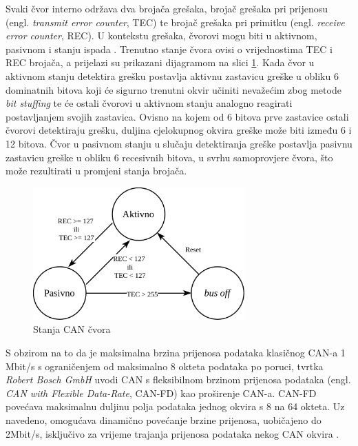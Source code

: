 \documentclass[times, utf8, diplomski, numeric]{fer}
\begin{document}
Svaki čvor interno održava dva brojača grešaka, brojač grešaka pri prijenosu (engl. \textit{transmit error counter}, TEC) te brojač grešaka pri primitku (engl. \textit{receive error counter}, REC). U kontekstu grešaka, čvorovi mogu biti u aktivnom, pasivnom i stanju ispada . Trenutno stanje čvora ovisi o vrijednostima TEC i REC brojača, a prijelazi su prikazani dijagramom na slici \ref{fig:error_stanja}. Kada čvor u aktivnom stanju detektira grešku postavlja aktivnu zastavicu greške u obliku 6 dominatnih bitova koji će sigurno trenutni okvir učiniti nevažećim zbog metode \textit{bit stuffing} te će ostali čvorovi u aktivnom stanju analogno reagirati postavljanjem svojih zastavica. Ovisno na kojem od 6 bitova prve zastavice ostali čvorovi detektiraju grešku, duljina cjelokupnog okvira greške može biti između 6 i 12 bitova. Čvor u pasivnom stanju u slučaju detektiranja greške postavlja pasivnu zastavicu greške u obliku 6 recesivnih bitova, u svrhu samoprovjere čvora, što može rezultirati u promjeni stanja brojača. 
\newpage
\begin{figure}[htb]
\centering
\includegraphics[width=230pt]{slike/stanja.png}
\caption{Stanja CAN čvora}
\label{fig:error_stanja}
\end{figure}

S obzirom na to da je maksimalna brzina prijenosa podataka klasičnog CAN-a 1 Mbit/s s ograničenjem od maksimalno 8 okteta podataka po poruci, tvrtka \textit{Robert Bosch GmbH} uvodi CAN s fleksibilnom brzinom prijenosa podataka (engl. \textit{CAN with Flexible Data-Rate}, CAN-FD) kao proširenje CAN-a. CAN-FD povećava maksimalnu duljinu polja podataka jednog okvira s 8 na 64 okteta. Uz navedeno, omogućava dinamično povećanje brzine prijenosa, uobičajeno do 2Mbit/s, isključivo za vrijeme trajanja prijenosa podataka nekog CAN okvira \cite{bosch2022handbook,nasser2023automotive}.
\end{document}
